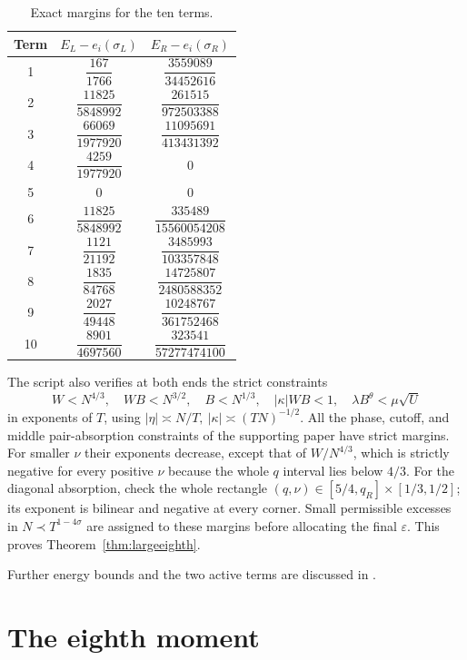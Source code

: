 \documentclass[11pt]{amsart}
\numberwithin{equation}{section}
\begin{document}
\begin{table}[htbp]
\centering
\small
\renewcommand{\arraystretch}{1.8}
\begin{tabular}{c cc}
\toprule
Term & $E_L-e_i(\sigma_L)$ & $E_R-e_i(\sigma_R)$\\
\midrule
1 & $\dfrac{167}{1766}$ & $\dfrac{3559089}{34452616}$ \\[5pt]
2 & $\dfrac{11825}{5848992}$ & $\dfrac{261515}{972503388}$ \\[5pt]
3 & $\dfrac{66069}{1977920}$ & $\dfrac{11095691}{413431392}$ \\[5pt]
4 & $\dfrac{4259}{1977920}$ & $0$ \\[5pt]
5 & $0$ & $0$ \\[5pt]
6 & $\dfrac{11825}{5848992}$ & $\dfrac{335489}{15560054208}$ \\[5pt]
7 & $\dfrac{1121}{21192}$ & $\dfrac{3485993}{103357848}$ \\[5pt]
8 & $\dfrac{1835}{84768}$ & $\dfrac{14725807}{2480588352}$ \\[5pt]
9 & $\dfrac{2027}{49448}$ & $\dfrac{10248767}{361752468}$ \\[5pt]
10 & $\dfrac{8901}{4697560}$ & $\dfrac{323541}{57277474100}$ \\[5pt]
\bottomrule
\end{tabular}
\caption{Exact margins for the ten terms.}\label{tab:margins}
\end{table}
The script  also verifies at both ends
the strict constraints
\[
 W<N^{4/3},\quad WB<N^{3/2},\quad B<N^{1/3},
 \quad |\kappa|WB<1,\quad
 \lambda B^\theta<\mu\sqrt U
\]
in exponents of $T$, using
\(|\eta|\asymp N/T,\ |\kappa|\asymp(TN)^{-1/2}\).
All the phase, cutoff, and middle pair-absorption constraints of the
supporting paper have strict margins. For smaller $\nu$ their exponents
decrease, except that of \(W/N^{4/3}\), which is strictly negative for
every positive $\nu$ because the whole $q$ interval lies below \(4/3\).
For the diagonal absorption, check the whole rectangle
\((q,\nu)\in[5/4,q_R]\times[1/3,1/2]\); its exponent is
bilinear and negative at every corner.
Small permissible excesses in \(N\prec T^{1-4\sigma}\) are assigned
to these margins before allocating the final $\varepsilon$.
This proves Theorem~\ref{thm:largeeighth}.


Further energy bounds and the two active terms are discussed in
\cite[Section 5]{Supp}.

\section{The eighth moment}\label{sec:eighth}
\end{document}
